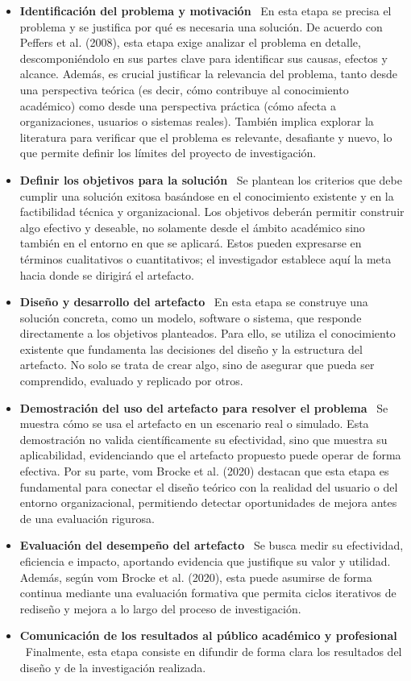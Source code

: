 \begin{itemize}[align=left, label=--]
\item \textbf{Identificación del problema y motivación} \
En esta etapa se precisa el problema y se justifica por qué es necesaria una solución. De acuerdo con Peffers et al. (2008), esta etapa exige analizar el problema en detalle, descomponiéndolo en sus partes clave para identificar sus causas, efectos y alcance. Además, es crucial justificar la relevancia del problema, tanto desde una perspectiva teórica (es decir, cómo contribuye al conocimiento académico) como desde una perspectiva práctica (cómo afecta a organizaciones, usuarios o sistemas reales).
También implica explorar la literatura para verificar que el problema es relevante, desafiante y nuevo, lo que permite definir los límites del proyecto de investigación.

\item \textbf{Definir los objetivos para la solución} \
Se plantean los criterios que debe cumplir una solución exitosa basándose en el conocimiento existente y en la factibilidad técnica y organizacional.
Los objetivos deberán permitir construir algo efectivo y deseable, no solamente desde el ámbito académico sino también en el entorno en que se aplicará. Estos pueden expresarse en términos cualitativos o cuantitativos; el investigador establece aquí la meta hacia donde se dirigirá el artefacto.

\item \textbf{Diseño y desarrollo del artefacto} \
En esta etapa se construye una solución concreta, como un modelo, software o sistema, que responde directamente a los objetivos planteados. Para ello, se utiliza el conocimiento existente que fundamenta las decisiones del diseño y la estructura del artefacto. No solo se trata de crear algo, sino de asegurar que pueda ser comprendido, evaluado y replicado por otros.

\item \textbf{Demostración del uso del artefacto para resolver el problema} \
Se muestra cómo se usa el artefacto en un escenario real o simulado. Esta demostración no valida científicamente su efectividad, sino que muestra su aplicabilidad, evidenciando que el artefacto propuesto puede operar de forma efectiva.
Por su parte, vom Brocke et al. (2020) destacan que esta etapa es fundamental para conectar el diseño teórico con la realidad del usuario o del entorno organizacional, permitiendo detectar oportunidades de mejora antes de una evaluación rigurosa.

\item \textbf{Evaluación del desempeño del artefacto} \
Se busca medir su efectividad, eficiencia e impacto, aportando evidencia que justifique su valor y utilidad. Además, según vom Brocke et al. (2020), esta puede asumirse de forma continua mediante una evaluación 
formativa que permita ciclos iterativos de rediseño y mejora a lo largo del proceso de investigación.
\item \textbf{Comunicación de los resultados al público académico y profesional} \
Finalmente, esta etapa consiste en difundir de forma clara los resultados del diseño y de la investigación realizada.
\end{itemize}


